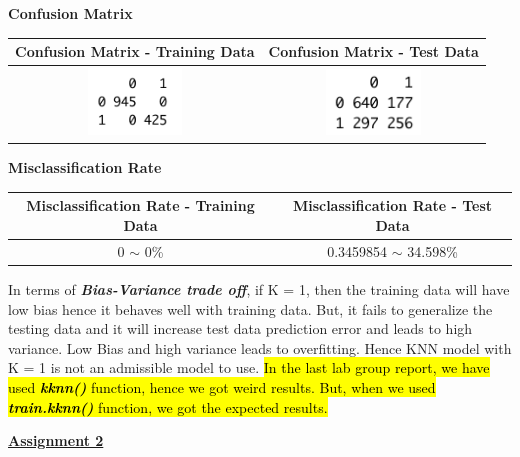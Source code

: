 \documentclass[a4paper,10pt]{article}
\begin{document}
\begin{center}
	\textbf{Confusion Matrix} \par
	\begin{tabular}{|c|c|}
		\hline
		Confusion Matrix - Training Data&
		Confusion Matrix - Test Data\\
		\hline
		\cellcolor{yellow!100} \includegraphics[width=25mm,scale=0.10]{Confusion_Matrix_knn_training_Data_2.png} &
		\cellcolor{yellow!100} \includegraphics[width=25mm,scale=0.10]{Confusion_Matrix_knn_test_Data_2.png}\\
		\hline
	\end{tabular}\par \par
	\textbf{Misclassification Rate} \par
	\begin{tabular}{|c|c|}
		\hline
		Misclassification Rate - Training Data&
		Misclassification Rate - Test Data\\
		\hline
		\cellcolor{yellow!100} 0 $\sim$ 0\% & \cellcolor{yellow!100} 0.3459854 $\sim$ 34.598\%\\
		\hline
	\end{tabular}\par
\end{center}
In terms of \textit{\textbf{Bias-Variance trade off}}, if K = 1, then the training data will have low bias hence it behaves
well with training data. But, it fails to generalize the testing data and it will increase test data prediction error and 
leads to high variance. Low Bias and high variance leads to overfitting. Hence KNN model with K = 1 is not an admissible
model to use. \hl{In the last lab group report, we have used \textbf{\textit{kknn()}} function, hence we got weird results. But,
when we used \textbf{\textit{train.kknn()}} function, we got the expected results.}
\par
\vspace{0.5cm}
\textbf{\underline{Assignment 2}} \par
\end{document}
